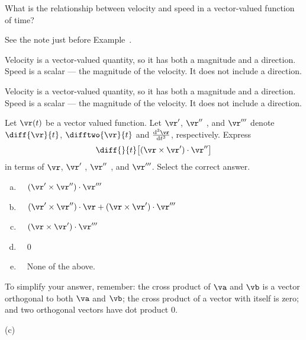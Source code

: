 \begin{question}
What is the relationship between velocity and speed in a vector-valued function of time?
\end{question}
\begin{hint} See the note just before Example~.
\end{hint}
\begin{answer}
Velocity is a vector-valued quantity, so it has both a magnitude and a direction. Speed is a scalar --- the magnitude of the velocity. It does not include a direction.
\end{answer}
\begin{solution}
Velocity is a vector-valued quantity, so it has both a magnitude and a direction. Speed is a scalar --- the magnitude of the velocity. It does not include a direction.
\end{solution}

\begin{question}[M317 2005D] %
Let $\vr(t)$ be a vector valued function. Let $\vr'$, $\vr''$ , and $\vr'''$ 
denote $\diff{\vr}{t}$, $\difftwo{\vr}{t}$ and 
$\frac{\mathrm{d^3}\hfil\vr\hfil}{\mathrm{d}{t}^3}$, respectively.
Express
\begin{equation*}
\diff{\hfill}{t}\big[ (\vr \times \vr')\cdot\vr'' \big]
\end{equation*}
in terms of $\vr$, $\vr'$ , $\vr''$ , and $\vr'''$. 
Select the correct answer.
\begin{enumerate}[(a)]
\item\ \  $(\vr'\times\vr'' )\cdot\vr'''$
\item\ \  $(\vr'\times\vr'' )\cdot\vr + (\vr\times\vr' )\cdot\vr'''$
\item\ \  $(\vr\times\vr' )\cdot\vr'''$
\item\ \  $0$
\item\ \  None of the above.
\end{enumerate}
\end{question}

\begin{hint} 
To simplify your answer, remember: the cross product of $\va$ and $\vb$ is a vector orthogonal to both $\va$ and $\vb$; the cross product of a vector with itself is zero; and two orthogonal vectors have dot product 0.
\end{hint}

\begin{answer} 
(c)
\end{answer}

